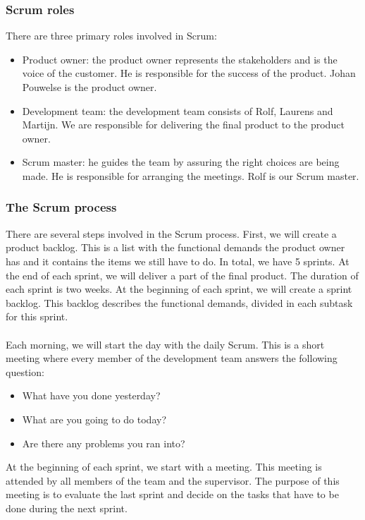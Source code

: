 \subsubsection{Scrum roles}
There are three primary roles involved in Scrum:
\begin{itemize}
\item Product owner: the product owner represents the stakeholders and is the voice of the customer. He is responsible for the success of the product. Johan Pouwelse is the product owner.
\item Development team: the development team consists of Rolf, Laurens and Martijn. We are responsible for delivering the final product to the product owner.
\item Scrum master: he guides the team by assuring the right choices are being made. He is responsible for arranging the meetings. Rolf is our Scrum master.
\end{itemize}

\subsubsection{The Scrum process}
There are several steps involved in the Scrum process. First, we will create a product backlog. This is a list with the functional demands the product owner has and it contains the items we still have to do. In total, we have 5 sprints. At the end of each sprint, we will deliver a part of the final product. The duration of each sprint is two weeks. At the beginning of each sprint, we will create a sprint backlog. This backlog describes the functional demands, divided in each subtask for this sprint.\\\\
Each morning, we will start the day with the daily Scrum. This is a short meeting where every member of the development team answers the following question:
\begin{itemize}
\item What have you done yesterday?
\item What are you going to do today?
\item Are there any problems you ran into?
\end{itemize}
At the beginning of each sprint, we start with a meeting. This meeting is attended by all members of the team and the supervisor. The purpose of this meeting is to evaluate the last sprint and decide on the tasks that have to be done during the next sprint.

